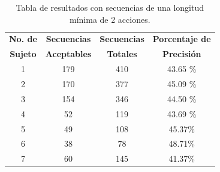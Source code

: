 \begin{table}[]
\centering
\caption{Tabla de resultados con secuencias de una longitud m\'inima de 
 2 acciones.}
\begin{tabular}{cccc}
\hline
\textbf{No. de }	
&	\textbf{Secuencias }	
&   \textbf{Secuencias }	
&	\textbf{Porcentaje de }	\\

\textbf{Sujeto}
&	\textbf{Aceptables}
&	\textbf{Totales}
&	\textbf{Precisi\'on}
	\\ \hline

1
&	179
&	410
&	43.65 \%		\\
	
2
&	170
&	377
&	45.09 \%		\\

3
&	154
&	346
&	44.50 \%		\\

4
&	52
&	119
&	43.69 \%		\\

5
&	49
&	108
&	45.37\%			\\

6
&	38
&	78
&	48.71\%			\\

7
&	60
&	145
&	41.37\%			\\
\hline
\end{tabular}

\label{tableRes2}
\end{table}

